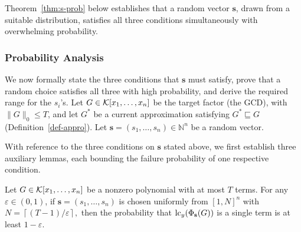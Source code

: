 \documentclass{article}
\numberwithin{equation}{section}
\begin{document}
Theorem~\ref{thm:s-prob} below establishes that a random vector $\mathbf{s}$, drawn from a suitable distribution, satisfies all three conditions simultaneously with overwhelming probability.

\subsubsection*{Probability Analysis}


We now formally state the three conditions that $\mathbf{s}$ must satisfy, prove that a random choice satisfies all three with high probability, and derive the required range for the $s_i$'s.
%
Let $G \in {\mathcal{K}}[x_1, \dots, x_n]$ be the target factor (the GCD), with $\|G\|_0 \le T$, and let $G^*$ be a current approximation satisfying $G^* \sqsubseteq G$ (Definition~\ref{def-appro}). Let $\mathbf{s} = (s_1, \dots, s_n) \in \mathbb{N}^n$ be a random vector.



With reference to the three conditions on $\mathbf{s}$ stated above, we first establish three auxiliary lemmas, each bounding the failure probability of one respective condition.

\begin{lemma}[Condition 1]\label{lem:leading}
Let $G \in {\mathcal{K}}[x_1, \dots, x_n]$ be a nonzero polynomial with at most $T$ terms. For any $\varepsilon \in (0,1)$, if $\mathbf{s} = (s_1, \dots, s_n)$ is chosen uniformly from $[1, N]^n$ with
%
$N = \left\lceil (T-1)/{\varepsilon} \right\rceil,$
%
then the probability that $\operatorname{lc}_y(\Phi_{\mathbf{s}}(G))$ is a single term is at least $1 - \varepsilon$.
\end{lemma}
\end{document}
